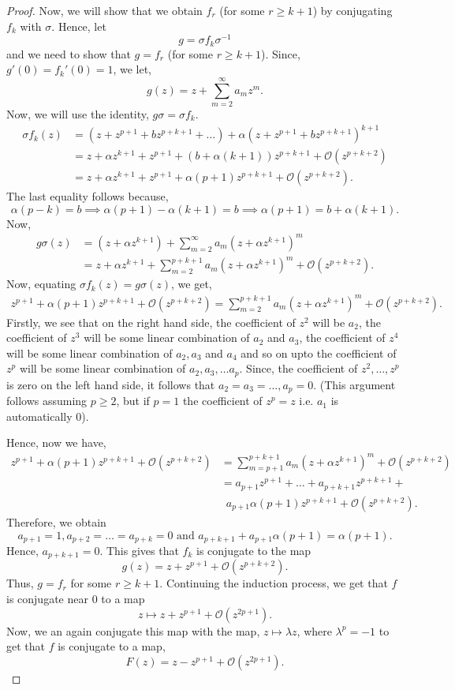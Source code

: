 \begin{proof}
	Now, we will show that we obtain \( f_r \) (for some \( r\ge k+1 \)) by conjugating 
	\( f_k \) with \( \sigma \).
	Hence, let \[
		g=\sigma f_k\sigma^{-1}
		\] and we need to show that \( g=f_r \) (for some \( r\ge k+1 \)). Since, \( g'(0)=f_k'(0)=1 \), we let, \[
	g(z)=z+\sum_{m=2}^\infty a_mz^m
	.\] 
	Now, we will use the identity, \( g\sigma=\sigma f_k \).
	\begin{align*}
		\sigma f_k(z)&=(z+z^{p+1}+bz^{p+k+1}+\ldots )+\alpha(z+z^{p+1}+bz^{p+k+1})^{k+1}\\
			   &=z+\alpha z^{k+1}+ z^{p+1}+(b+\alpha(k+1))z^{p+k+1}+\mathcal{O}(z^{p+k+2})\\
			   &=z+\alpha z^{k+1}+ z^{p+1}+\alpha(p+1)z^{p+k+1}+\mathcal{O}(z^{p+k+2})
	.\end{align*}
	The last equality follows because, \[ \alpha(p-k)=b\implies \alpha(p+1)-\alpha(k+1)=b\implies\alpha(p+1)=b+\alpha(k+1). \]
	Now,
	\begin{align*}
		g\sigma(z)&=(z+\alpha z^{k+1})+\sum_{m=2}^\infty a_m(z+\alpha z^{k+1})^m\\
				  &=z+\alpha z^{k+1}+\sum_{m=2}^{p+k+1}a_m(z+\alpha z^{k+1})^m+\mathcal{O}(z^{p+k+2})
	.\end{align*}
	Now, equating \( \sigma f_k(z)=g\sigma(z) \), we get,
	\begin{align*}
		z^{p+1}+\alpha(p+1)z^{p+k+1}+\mathcal{O}(z^{p+k+2})=\sum_{m=2}^{p+k+1} a_m(z+\alpha z^{k+1})^m+\mathcal{O}(z^{p+k+2})
	.\end{align*}
	Firstly, we see that on the right hand side, the coefficient of \( z^2 \) will be \( a_2 \),
	the coefficient of \( z^3 \) will be some linear combination of \( a_2 \) and \( a_3 \), the
	coefficient of \( z^4 \) will be some linear combination of \( a_2,a_3 \) and \( a_4 \) and so on upto the coefficient of \( z^p \) will be some linear combination of \( a_2,a_3,\ldots a_p \).
	Since, the coefficient of \( z^2,\ldots ,z^p \) is zero on the left hand side, it follows that \( a_2=a_3=\ldots, a_p=0 \). (This argument follows assuming \( p\ge 2 \), but if \( p=1 \) the coefficient of \( z^p=z \) i.e. \( a_1 \) is automatically \( 0 \)).

	Hence, now we have,
	\begin{align*}
		z^{p+1}+\alpha(p+1)z^{p+k+1}+\mathcal{O}(z^{p+k+2})&=\sum_{m=p+1}^{p+k+1} a_m(z+\alpha z^{k+1})^m+\mathcal{O}(z^{p+k+2})\\
														   &=a_{p+1}z^{p+1}+\ldots +a_{p+k+1}z^{p+k+1}+\\&\,\,\,a_{p+1}\alpha(p+1)z^{p+k+1}+\mathcal{O}(z^{p+k+2})
	.\end{align*}
	Therefore, we obtain \[
		a_{p+1}=1,a_{p+2}=\ldots =a_{p+k}=0\text{ and }a_{p+k+1}+a_{p+1}\alpha(p+1)=\alpha(p+1)
	.\] 
	Hence, \( a_{p+k+1}=0 \). This gives that \( f_k \) is conjugate to the map \[
		g(z)=z+z^{p+1}+\mathcal{O}(z^{p+k+2})
	.\] 
	Thus, \( g=f_r \) for some \( r\ge k+1 \). Continuing the induction process, we get that \( f \)
	is conjugate near \( 0 \) to a map \[
		z\mapsto z+z^{p+1}+\mathcal{O}(z^{2p+1})
	.\] 
	Now, we an again conjugate this map with the map, \( z\mapsto \lambda z \), where \( \lambda^p=-1 \) to get that \( f \) is conjugate to a map, \[
		F(z)=z-z^{p+1}+\mathcal{O}(z^{2p+1})
	.\] 
\end{proof}
